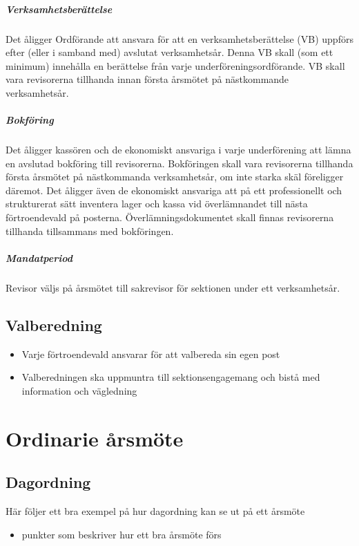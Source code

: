 \documentclass{../resources/dgovdoc}
\begin{document}
\subparagraph{Verksamhetsberättelse}

Det åligger Ordförande att ansvara för att en verksamhetsberättelse (VB) uppförs efter (eller i samband med) avslutat verksamhetsår. Denna VB skall (som ett minimum) innehålla en berättelse från varje underföreningsordförande. VB skall vara revisorerna tillhanda innan första årsmötet på nästkommande verksamhetsår.

\subparagraph{Bokföring}

Det åligger kassören och de ekonomiskt ansvariga i varje underförening att lämna en avslutad bokföring till revisorerna. Bokföringen skall vara revisorerna tillhanda första årsmötet på nästkommanda verksamhetsår, om inte starka skäl föreligger däremot.
Det åligger även de ekonomiskt ansvariga att på ett professionellt och strukturerat sätt inventera lager och kassa vid överlämnandet till nästa förtroendevald på posterna. Överlämningsdokumentet skall finnas revisorerna tillhanda tillsammans med bokföringen. 

\subparagraph{Mandatperiod}

Revisor väljs på årsmötet till sakrevisor för sektionen under ett verksamhetsår.

\subsection{Valberedning}

\begin{itemize}

\item Varje förtroendevald ansvarar för att valbereda sin egen post
\item Valberedningen ska uppmuntra till sektionsengagemang och bistå med information och vägledning

\end{itemize}

\section{Ordinarie årsmöte}

\subsection{Dagordning}

Här följer ett bra exempel på hur dagordning kan se ut på ett årsmöte

\begin{itemize}
\item punkter som beskriver hur ett bra årsmöte förs
\end{itemize}
\end{document}
